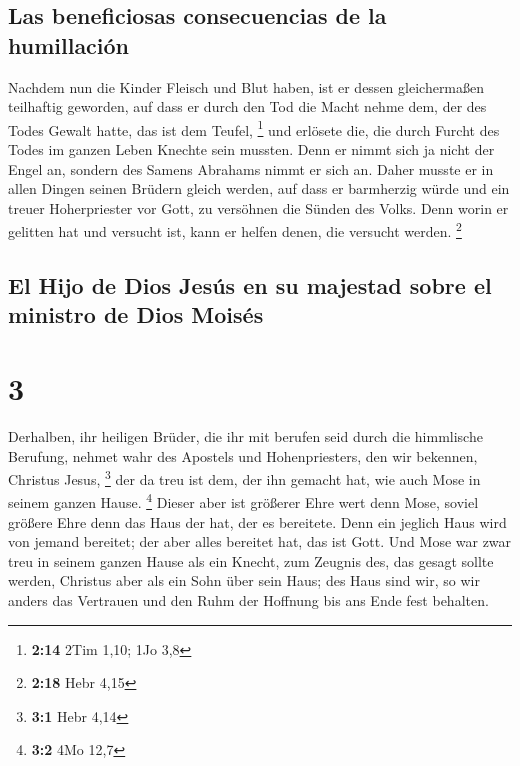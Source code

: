\hypertarget{las-beneficiosas-consecuencias-de-la-humillaciuxf3n}{%
\subsection{Las beneficiosas consecuencias de la
humillación}\label{las-beneficiosas-consecuencias-de-la-humillaciuxf3n}}

 Nachdem nun die Kinder Fleisch und Blut haben, ist er
dessen gleichermaßen teilhaftig geworden, auf dass er durch den Tod die
Macht nehme dem, der des Todes Gewalt hatte, das ist dem Teufel,
\footnote{\textbf{2:14} 2Tim 1,10; 1Jo 3,8}  und erlösete
die, die durch Furcht des Todes im ganzen Leben Knechte sein mussten.
 Denn er nimmt sich ja nicht der Engel an, sondern des
Samens Abrahams nimmt er sich an.  Daher musste er in
allen Dingen seinen Brüdern gleich werden, auf dass er barmherzig würde
und ein treuer Hoherpriester vor Gott, zu versöhnen die Sünden des
Volks.  Denn worin er gelitten hat und versucht ist, kann
er helfen denen, die versucht werden. \footnote{\textbf{2:18} Hebr 4,15}

\hypertarget{el-hijo-de-dios-jesuxfas-en-su-majestad-sobre-el-ministro-de-dios-moisuxe9s}{%
\subsection{El Hijo de Dios Jesús en su majestad sobre el ministro de
Dios
Moisés}\label{el-hijo-de-dios-jesuxfas-en-su-majestad-sobre-el-ministro-de-dios-moisuxe9s}}

\hypertarget{section-2}{%
\section{3}\label{section-2}}

 Derhalben, ihr heiligen Brüder, die ihr mit berufen seid
durch die himmlische Berufung, nehmet wahr des Apostels und
Hohenpriesters, den wir bekennen, Christus Jesus, \footnote{\textbf{3:1}
  Hebr 4,14}  der da treu ist dem, der ihn gemacht hat,
wie auch Mose in seinem ganzen Hause. \footnote{\textbf{3:2} 4Mo 12,7}
 Dieser aber ist größerer Ehre wert denn Mose, soviel
größere Ehre denn das Haus der hat, der es bereitete. 
Denn ein jeglich Haus wird von jemand bereitet; der aber alles bereitet
hat, das ist Gott.  Und Mose war zwar treu in seinem
ganzen Hause als ein Knecht, zum Zeugnis des, das gesagt sollte werden,
 Christus aber als ein Sohn über sein Haus; des Haus sind
wir, so wir anders das Vertrauen und den Ruhm der Hoffnung bis ans Ende
fest behalten.

